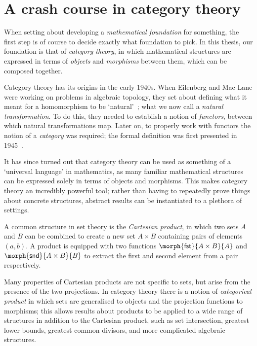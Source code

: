 \chapter{A crash course in category theory}

When setting about developing a \emph{mathematical foundation} for something,
the first step is of course to decide exactly what foundation to pick.
In this thesis, our foundation is that of \emph{category theory}, in which
mathematical structures are expressed in terms of \emph{objects} and
\emph{morphisms} between them, which can be composed together.

Category theory has its origins in the early 1940s.
When Eilenberg and Mac Lane were working on problems in algebraic topology, they
set about defining what it meant for a homomorphism to be
`natural'~\cite{eilenberg1942natural}; what we now call a
\emph{natural transformation}.
To do this, they needed to establish a notion of \emph{functors}, between which
natural transformations map.
Later on, to properly work with functors the notion of a \emph{category} was
required; the formal definition was first presented in
1945~\cite{eilenberg1945general}.

It has since turned out that category theory can be used as something of a
`universal language' in mathematics, as many familiar mathematical structures
can be expressed solely in terms of objects and morphisms.
This makes category theory an incredibly powerful tool; rather than having to
repeatedly prove things about concrete structures, abstract results can be
instantiated to a plethora of settings.

\begin{example}
    A common structure in set theory is the \emph{Cartesian product}, in
    which two sets \(A\) and \(B\) can be combined to create a new set
    \(A \times B\) containing pairs of elements \((a,b)\).
    A product is equipped with two functions
    \(\morph{\mathsf{fst}}{A \times B}{A}\) and
    \(\morph{\mathsf{snd}}{A \times B}{B}\) to extract the first and second
    element from a pair respectively.

    Many properties of Cartesian products are not specific to sets,
    but arise from the presence of the two projections.
    In category theory there is a notion of \emph{categorical product} in which
    sets are generalised to objects and the projection functions to morphisms;
    this allows results about products to be applied to a wide range of
    structures in addition to the Cartesian product, such as set intersection,
    greatest lower bounds, greatest common divisors, and more complicated
    algebraic structures.
\end{example}

